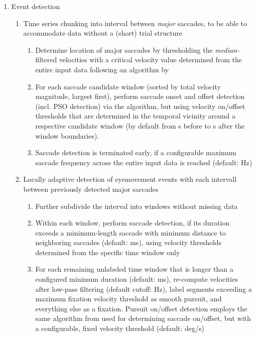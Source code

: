 \begin{enumerate}
\begin{enumerate}
    \end{enumerate}
  \item Event detection
    \begin{enumerate}
      \item Time series chunking into interval between \textit{major} saccades, to be able to accommodate data without a (short) trial structure
        \begin{enumerate}
          \item Determine location of major saccades by thresholding the \textit{median-}filtered velocities with a critical velocity value determined from the entire input data following an algorithm by \citep{Nystrom2010AnData}
          \item For each saccade candidate window (sorted by total velocity magnitude, largest first), perform saccade onset and offset detection (incl. PSO detection) via the \cite{Nystrom2010AnData} algorithm, but using velocity on/offset thresholds that are determined in the temporal vicinity around a respective candidate window (by default from \unit[1]{s} before to \unit[1]{s} after the window boundaries).
          \item Saccade detection is terminated early, if a configurable maximum saccade
            frequency across the entire input data is reached (default: \unit[2]{Hz})
        \end{enumerate}
      \item Locally adaptive detection of eyemovement events with each intervall between
        previously detected major saccades
        \begin{enumerate}
          \item Further subdivide the interval into windows without missing data
          \item Within each window, perform saccade detection, if its duration exceeds
            a minimum-length saccade with minimum distance to neighboring saccades
            (default: \unit[130]{ms}), using velocity thresholds determined from the
            specific time window only
          \item For each remaining unlabeled time window that is longer than a
            configured minimum duration (default: \unit[40]{ms}), re-compute velocities
            after low-pass filtering (default cutoff: \unit[4]{Hz}), label segments
            exceeding a maximum fixation velocity threshold
            as smooth pursuit, and everything else as a fixation. Pursuit on/offset
            detection employs the same algorithm from \cite{Nystrom2010AnData} used for
            determining saccade on/offset, but with a configurable, fixed velocity threshold
            (default: \unit[2]{deg/s})
        \end{enumerate}

    \end{enumerate}
\end{enumerate}

